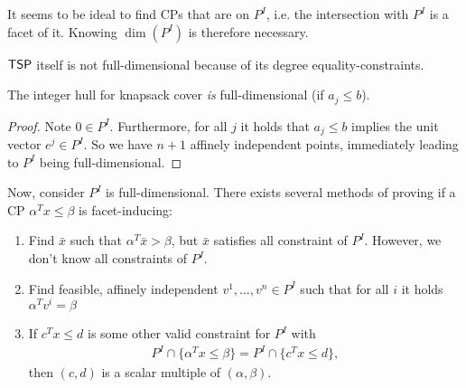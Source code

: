 \begin{observe}
    It seems to be ideal to find CPs that are  on $P^I$, i.e. the intersection with
    $P^I$ is a facet of it. Knowing $\dim(P^I)$ is therefore necessary.
\end{observe}
$\mathsf{TSP}$ itself is not full-dimensional because of its degree equality-constraints.
\begin{theorem}
    The integer hull for knapsack cover \emph{is} full-dimensional (if $a_j \leq b$).
\end{theorem}
\begin{proof}
    Note $0 \in P^I$. Furthermore, for all $j$ it holds that $a_j \leq b$ implies the unit vector $e^j \in P^I$.
    So we have $n+1$ affinely independent points, immediately leading to $P^I$ being full-dimensional.
\end{proof}
Now, consider $P^I$ is full-dimensional.
There exists several methods of proving if a CP $\alpha^Tx \leq \beta$ is facet-inducing:
\begin{enumerate}
    \item Find $\bar x$ such that $\alpha^T\bar x > \beta$, but $\bar x$ satisfies all constraint of $P^I$.
          However, we don't know all constraints of $P^I$.
    \item Find feasible, affinely independent $v^1,\dots,v^n \in P^I$ such that for all $i$ it holds $\alpha^Tv^i = \beta$
    \item If $c^Tx \leq d$ is some other valid constraint for $P^I$ with
          \begin{align*}
              P^I \cap \{\alpha^Tx \leq \beta\} = P^I \cap \{c^Tx \leq d\},
          \end{align*}
          then $(c,d)$ is a scalar multiple of $(\alpha,\beta)$.
\end{enumerate}